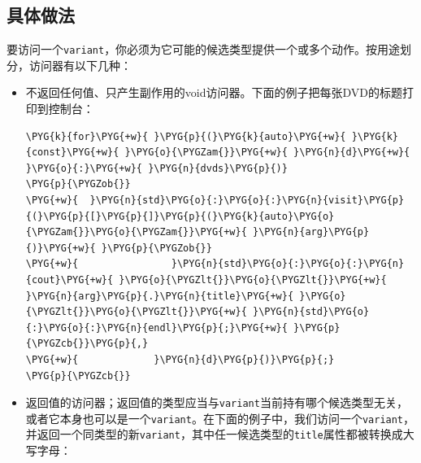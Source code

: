 
\subsection{具体做法}



要访问一个\texttt{variant}，你必须为它可能的候选类型提供一个或多个动作。按用途划分，访问器有以下几种：



\begin{itemize}
\item 不返回任何值、只产生副作用的void访问器。下面的例子把每张DVD的标题打印到控制台：



\begin{codeblockbg}
\begin{Verbatim}[commandchars=\\\{\},breaklines=true,breakanywhere=true,fontsize=\codefont,xleftmargin=17bp]
\PYG{k}{for}\PYG{+w}{ }\PYG{p}{(}\PYG{k}{auto}\PYG{+w}{ }\PYG{k}{const}\PYG{+w}{ }\PYG{o}{\PYGZam{}}\PYG{+w}{ }\PYG{n}{d}\PYG{+w}{ }\PYG{o}{:}\PYG{+w}{ }\PYG{n}{dvds}\PYG{p}{)}
\PYG{p}{\PYGZob{}}
\PYG{+w}{  }\PYG{n}{std}\PYG{o}{:}\PYG{o}{:}\PYG{n}{visit}\PYG{p}{(}\PYG{p}{[}\PYG{p}{]}\PYG{p}{(}\PYG{k}{auto}\PYG{o}{\PYGZam{}}\PYG{o}{\PYGZam{}}\PYG{+w}{ }\PYG{n}{arg}\PYG{p}{)}\PYG{+w}{ }\PYG{p}{\PYGZob{}}
\PYG{+w}{                }\PYG{n}{std}\PYG{o}{:}\PYG{o}{:}\PYG{n}{cout}\PYG{+w}{ }\PYG{o}{\PYGZlt{}}\PYG{o}{\PYGZlt{}}\PYG{+w}{ }\PYG{n}{arg}\PYG{p}{.}\PYG{n}{title}\PYG{+w}{ }\PYG{o}{\PYGZlt{}}\PYG{o}{\PYGZlt{}}\PYG{+w}{ }\PYG{n}{std}\PYG{o}{:}\PYG{o}{:}\PYG{n}{endl}\PYG{p}{;}\PYG{+w}{ }\PYG{p}{\PYGZcb{}}\PYG{p}{,}
\PYG{+w}{             }\PYG{n}{d}\PYG{p}{)}\PYG{p}{;}
\PYG{p}{\PYGZcb{}}
\end{Verbatim}
\end{codeblockbg}



\item 返回值的访问器；返回值的类型应当与\texttt{variant}当前持有哪个候选类型无关，或者它本身也可以是一个\texttt{variant}。在下面的例子中，我们访问一个\texttt{variant}，并返回一个同类型的新\texttt{variant}，其中任一候选类型的\texttt{title}属性都被转换成大写字母：




\end{itemize}
